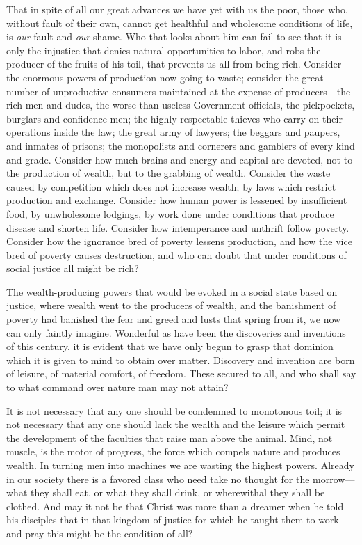 \documentclass{book}
\begin{document}
That in spite of all our great advances we have yet with us the poor, those who, without fault of their own, cannot get healthful and wholesome conditions of life, is \emph{our} fault and \emph{our} shame. Who that looks about him can fail to see that it is only the injustice that denies natural opportunities to labor, and robs the producer of the fruits of his toil, that prevents us all from being rich. Consider the enormous powers of production now going to waste; consider the great number of unproductive consumers maintained at the expense of producers—the rich men and dudes, the worse than useless Government officials, the pickpockets, burglars and confidence men; the highly respectable thieves who carry on their operations inside the law; the great army of lawyers; the beggars and paupers, and inmates of prisons; the monopolists and cornerers and gamblers of every kind and grade. Consider how much brains and energy and capital are devoted, not to the production of wealth, but to the grabbing of wealth. Consider the waste caused by competition which does not increase wealth; by laws which restrict production and exchange. Consider how human power is lessened by insufficient food, by unwholesome lodgings, by work done under conditions that produce disease and shorten life. Consider how intemperance and unthrift follow poverty. Consider how the ignorance bred of poverty lessens production, and how the vice bred of poverty causes destruction, and who can doubt that under conditions of social justice all might be rich?

The wealth-producing powers that would be evoked in a social state based on justice, where wealth went to the producers of wealth, and the banishment of poverty had banished the fear and greed and lusts that spring from it, we now can only faintly imagine. Wonderful as have been the discoveries and inventions of this century, it is evident that we have only begun to grasp that dominion which it is given to mind to obtain over matter. Discovery and invention are born of leisure, of material comfort, of freedom. These secured to all, and who shall say to what command over nature man may not attain?

It is not necessary that any one should be condemned to monotonous toil; it is not necessary that any one should lack the wealth and the leisure which permit the development of the faculties that raise man above the animal. Mind, not muscle, is the motor of progress, the force which compels nature and produces wealth. In turning men into machines we are wasting the highest powers. Already in our society there is a favored class who need take no thought for the morrow—what they shall eat, or what they shall drink, or wherewithal they shall be clothed. And may it not be that Christ was more than a dreamer when he told his disciples that in that kingdom of justice for which he taught them to work and pray this might be the condition of all?
\end{document}
